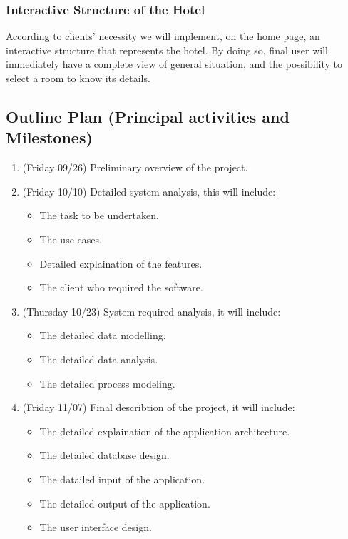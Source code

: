  \subsubsection{Interactive Structure of the Hotel}
	
According to clients’ necessity we will implement, on the home page, an interactive structure that represents the hotel. 
By doing so, final user will immediately have a complete view of general situation, and the possibility to select a room to know its details.

\subsection{Outline Plan (Principal activities and Milestones)}

\begin{enumerate}

\item (Friday 09/26) Preliminary overview of the project.

\item (Friday 10/10) Detailed system analysis, this will include:
	\begin{itemize}
		\item The task to be undertaken.
		\item The use cases.
		\item Detailed explaination of the features.
		\item The client who required the software.
	\end{itemize}

\item (Thursday 10/23) System required analysis, it will include:
	\begin{itemize}
		\item The detailed data modelling.
		\item The detailed data analysis.
		\item The detailed process modeling. 
	\end{itemize}

\item (Friday 11/07) Final describtion of the project, it will include:
	\begin{itemize}
		\item The detailed explaination of the application architecture.
		\item The detailed database design.
		\item The datailed input of the application.
		\item The detailed output of the application.
		\item The user interface design.
	\end{itemize}

\end{enumerate}
